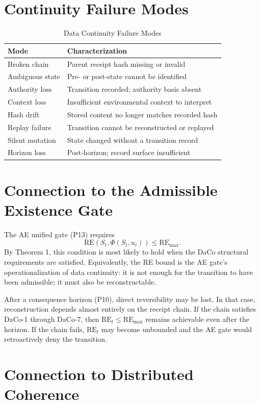 \documentclass[letterpaper,10pt,conference]{ieeeconf}
\newcommand{\Phiop}{\Phi}
\newcommand{\RE}{\mathrm{RE}}
\newcommand{\St}{S_t}
\newcommand{\ut}{u_t}
\begin{document}
\section{Continuity Failure Modes}

\begin{table}[h]
\centering
\caption{Data Continuity Failure Modes}
\begin{tabular}{ll}
\hline
Mode & Characterization \\
\hline
Broken chain & Parent receipt hash missing or invalid \\
Ambiguous state & Pre- or post-state cannot be identified \\
Authority loss & Transition recorded; authority basis absent \\
Context loss & Insufficient environmental context to interpret \\
Hash drift & Stored content no longer matches recorded hash \\
Replay failure & Transition cannot be reconstructed or replayed \\
Silent mutation & State changed without a transition record \\
Horizon loss & Post-horizon; record surface insufficient \\
\hline
\end{tabular}
\end{table}

\section{Connection to the Admissible Existence Gate}

The AE unified gate (P13) requires
\[
\RE(\St, \Phiop(\St,\ut)) \le \RE_{\max}.
\]
By Theorem 1, this condition is most likely to hold when the DaCo structural requirements are satisfied. Equivalently, the RE bound is the AE gate's operationalization of data continuity: it is not enough for the transition to have been admissible; it must also be reconstructable.

After a consequence horizon (P10), direct reversibility may be lost. In that case, reconstruction depends almost entirely on the receipt chain. If the chain satisfies DaCo-1 through DaCo-7, then $\RE_t \le \RE_{\max}$ remains achievable even after the horizon. If the chain fails, $\RE_t$ may become unbounded and the AE gate would retroactively deny the transition.

\section{Connection to Distributed Coherence}
\end{document}
